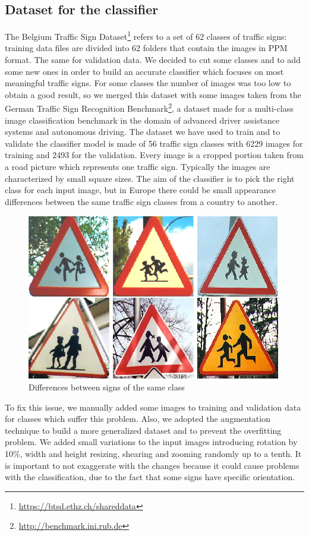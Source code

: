 \documentclass[10pt,twocolumn,letterpaper]{article}
\begin{document}
\subsection{Dataset for the classifier}
The Belgium Traffic Sign Dataset\footnote{\url{https://btsd.ethz.ch/shareddata}} refers to a set of 62 classes of traffic signs: training data files are divided into 62 folders that contain the images in PPM format. The same for validation data. We decided to cut some classes and to add some new ones in order to build an accurate classifier which focuses on most meaningful traffic signs. For some classes the number of images was too low to obtain a good result, so we merged this dataset with some images taken from the German Traffic Sign Recognition Benchmark\footnote{\url{http://benchmark.ini.rub.de}}, a dataset made for a multi-class image classification benchmark in the domain of advanced driver assistance systems and autonomous driving. The dataset we have used to train and to validate the classifier model is made of 56 traffic sign classes with 6229 images for training and 2493 for the validation. Every image is a cropped portion taken from a road picture which represents one traffic sign. Typically the images are characterized by small square sizes. The aim of the classifier is to pick the right class for each input image, but in Europe there could be small appearance differences between the same traffic sign classes from a country to another. 
\begin{figure}{}
	\centering
	\includegraphics[width=0.6\linewidth]{Res/Immagini/differences.png}
	\caption{Differences between signs of the same class}\label{}
\end{figure}
To fix this issue, we manually added some images to training and validation data for classes which suffer this problem. Also, we adopted the augmentation technique to build a more generalized dataset and to prevent the overfitting problem. We added small variations to the input images introducing rotation by 10\%, width and height resizing, shearing and zooming randomly up to a tenth. It is important to not exaggerate with the changes because it could cause problems with the classification, due to the fact that some signs have specific orientation.
\end{document}

